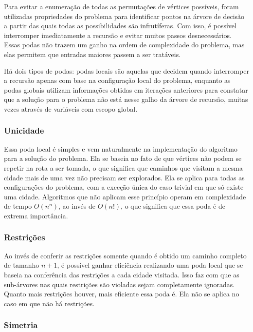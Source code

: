 \documentclass[10pt,a4paper]{article}
\numberwithin{equation}{section}
\begin{document}
Para evitar a enumeração de todas as permutações de vértices possíveis, foram utilizadas propriedades do problema para identificar pontos na árvore de decisão a partir das quais todas as possibilidades são infrutíferas. Com isso, é possível interromper imediatamente a recursão e evitar muitos passos desnecessários. Essas podas não trazem um ganho na ordem de complexidade do problema, mas elas permitem que entradas maiores passem a ser tratáveis.

Há dois tipos de podas: podas locais são aquelas que decidem quando interromper a recursão apenas com base na configuração local do problema, enquanto as podas globais utilizam informações obtidas em iterações anteriores para constatar que a solução para o problema não está nesse galho da árvore de recursão, muitas vezes através de variáveis com escopo global.

\subsubsection{Unicidade}

Essa poda local é simples e vem naturalmente na implementação do algoritmo para a solução do problema. Ela se baseia no fato de que vértices não podem se repetir na rota a ser tomada, o que significa que caminhos que visitam a mesma cidade mais de uma vez não precisam ser explorados. Ela se aplica para todas as configurações do problema, com a exceção única do caso trivial em que só existe uma cidade. Algoritmos que não aplicam esse princípio operam em complexidade de tempo $O(n^n)$, ao invés de $O(n!)$, o que significa que essa poda é de extrema importância.

\subsubsection{Restrições}

Ao invés de conferir as restrições somente quando é obtido um caminho completo de tamanho $n+1$, é possível ganhar eficiência realizando uma poda local que se baseia na conferência das restrições a cada cidade visitada. Isso faz com que as sub-árvores nas quais restrições são violadas sejam completamente ignoradas. Quanto mais restrições houver, mais eficiente essa poda é. Ela não se aplica no caso em que não há restrições.

\subsubsection{Simetria}
\end{document}
